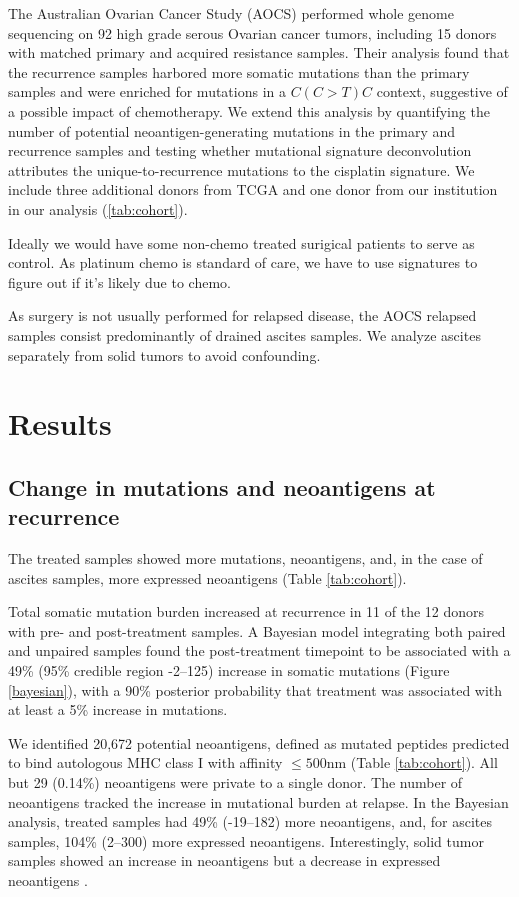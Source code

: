 The Australian Ovarian Cancer Study (AOCS)\cite{Patch_2015} performed whole genome sequencing on 92 high grade serous Ovarian cancer tumors, including 15 donors with matched primary and acquired resistance samples. Their analysis found that the recurrence samples harbored more somatic mutations than the primary samples and were enriched for mutations in a $C(C \gt T)C$ context, suggestive of a possible impact of chemotherapy. We extend this analysis by quantifying the number of potential neoantigen-generating mutations in the primary and recurrence samples and testing whether mutational signature deconvolution attributes the unique-to-recurrence mutations to the  cisplatin signature. We include three additional donors from TCGA and one donor from our institution in our analysis (\ref{tab:cohort}).

Ideally we would have some non-chemo treated surigical patients to serve as control. As platinum chemo is standard of care, we have to use signatures to figure out if it's likely due to chemo.

As surgery is not usually performed for relapsed disease, the AOCS relapsed samples consist predominantly of drained ascites samples. We analyze ascites separately from solid tumors to avoid confounding.



\section*{Results}

\subsection*{Change in mutations and neoantigens at recurrence}
The treated samples showed more mutations, neoantigens, and, in the case of ascites samples, more expressed neoantigens (Table \ref{tab:cohort}).

Total somatic mutation burden increased at recurrence in 11 of the 12 donors with pre- and post-treatment samples. A Bayesian model integrating both paired and unpaired samples found the post-treatment timepoint to be associated with a 49\% (95\% credible region -2--125) increase in somatic mutations (Figure \ref{bayesian}), with a 90\% posterior probability that treatment was associated with at least a 5\% increase in mutations.

We identified 20,672 potential neoantigens, defined as mutated peptides predicted to bind autologous MHC class I with affinity $\leq 500$nm (Table \ref{tab:cohort}). All but 29 (0.14\%) neoantigens were private to a single donor. The number of neoantigens tracked the increase in mutational burden at relapse. In the Bayesian analysis, treated samples had 49\% (-19--182) more neoantigens, and, for ascites samples, 104\% (2--300) more expressed neoantigens. Interestingly, solid tumor samples showed an increase in neoantigens but a decrease in expressed neoantigens .

